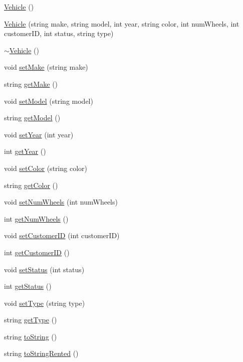 \begin{DoxyCompactItemize}
\item 
\hyperlink{class_vehicle_abaad8187d9f2ede4fb8ea18de0a6764c}{Vehicle} ()
\item 
\hyperlink{class_vehicle_a7c366af6337bace71aab2a56bade1b51}{Vehicle} (string make, string model, int year, string color, int num\+Wheels, int customer\+ID, int status, string type)
\item 
\hyperlink{class_vehicle_a61ab140c755b8e0e824d54117cf4546f}{$\sim$\+Vehicle} ()
\item 
void \hyperlink{class_vehicle_a889588751f2751b4c76740407a769ca2}{set\+Make} (string make)
\item 
string \hyperlink{class_vehicle_afc39d455c65b61ffe827127edb92bfc5}{get\+Make} ()
\item 
void \hyperlink{class_vehicle_a3a813eb34cc39eb0790e3b04d2d975e3}{set\+Model} (string model)
\item 
string \hyperlink{class_vehicle_a4ea5cae65802d874f9035f98cafaf51c}{get\+Model} ()
\item 
void \hyperlink{class_vehicle_a8f26a947749fc447adbfb48b3bf5f289}{set\+Year} (int year)
\item 
int \hyperlink{class_vehicle_a206f357a7b9202335f143c1ca3477ef1}{get\+Year} ()
\item 
void \hyperlink{class_vehicle_acdf4eb878866cb43045cd0c62ad808cd}{set\+Color} (string color)
\item 
string \hyperlink{class_vehicle_a94445efb02e754a205520bf39789e031}{get\+Color} ()
\item 
void \hyperlink{class_vehicle_a91f4ad00bfe3d0d330632caf3c1fe77a}{set\+Num\+Wheels} (int num\+Wheels)
\item 
int \hyperlink{class_vehicle_afd8d35a0deef1e846396f90737be9655}{get\+Num\+Wheels} ()
\item 
void \hyperlink{class_vehicle_ab15f9d0d115fa64ec5b3a6c40caca2ff}{set\+Customer\+ID} (int customer\+ID)
\item 
int \hyperlink{class_vehicle_a47dba04c728156ee3e2447cd7d3745c0}{get\+Customer\+ID} ()
\item 
void \hyperlink{class_vehicle_aa547452a11bfd2b20c79b7ee72309a00}{set\+Status} (int status)
\item 
int \hyperlink{class_vehicle_a835b1213216a5821abab0250231f6f2b}{get\+Status} ()
\item 
void \hyperlink{class_vehicle_a053568fb129b4294a82553d68880b07a}{set\+Type} (string type)
\item 
string \hyperlink{class_vehicle_a540c0784a94f351f90011a7e9fee39f0}{get\+Type} ()
\item 
string \hyperlink{class_vehicle_abd9381537867c1a98430ab06ce51898f}{to\+String} ()
\item 
string \hyperlink{class_vehicle_aa614254249eb1f1c0221b782c47d269e}{to\+String\+Rented} ()
\end{DoxyCompactItemize}
